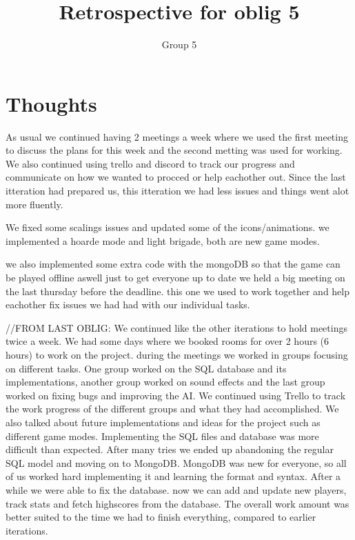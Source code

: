\documentclass{article}
\title{Retrospective for oblig 5}
\author{Group 5}
\date{}
\begin{document}
    \maketitle

    \section{Thoughts}
    \noindent
    As usual we continued having 2 meetings a week where we used the first meeting to discuss the plans for this week and the second metting was used for working.
    We also continued using trello and discord to track our progress and communicate on how we wanted to procced or help eachother out.
    Since the last itteration had prepared us, this itteration we had less issues and things went alot more fluently.

    We fixed some scalings issues and updated some of the icons/animations.
    we implemented a hoarde mode and light brigade, both are new game modes.

    we also implemented some extra code with the mongoDB so that the game can be played offline aswell
    just to get everyone up to date we held a big meeting on the last thursday before the deadline. this one we used to work together and help eachother fix issues
    we had had with our individual tasks.












    //FROM LAST OBLIG:
     We continued like the other iterations to hold meetings twice a week. We had some days where we booked rooms for over 2 hours (6 hours) to work on the project.
     during the meetings we worked in groups focusing on different tasks. One group worked on the SQL database and its implementations, another group worked on sound effects
     and the last group worked on fixing bugs and improving the AI. We continued using Trello to track the work progress of the different groups and what they had accomplished.
     We also talked about future implementations and ideas for the project such as different game modes.
     Implementing the SQL files and database was more difficult than expected.
     After many tries we ended up abandoning the regular SQL model and moving on to MongoDB. MongoDB was new for everyone, so all of us worked hard
     implementing it and learning the format and syntax. After a while we were able to fix the database. now we can add and update new players, track
     stats and fetch highscores from the database. The overall work amount was better suited to the time we had to finish everything, compared to earlier iterations.
\end{document}
